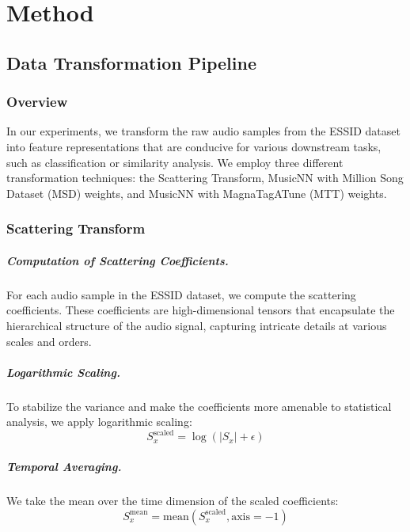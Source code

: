 \chapter{Method}
\label{ch:method}

\section{Data Transformation Pipeline}

\subsection{Overview}

In our experiments, we transform the raw audio samples from the ESSID dataset into feature representations that are conducive for various downstream tasks, such as classification or similarity analysis. We employ three different transformation techniques: the Scattering Transform, MusicNN with Million Song Dataset (MSD) weights, and MusicNN with MagnaTagATune (MTT) weights.

\subsection{Scattering Transform}

\paragraph{Computation of Scattering Coefficients.}
For each audio sample in the ESSID dataset, we compute the scattering coefficients. These coefficients are high-dimensional tensors that encapsulate the hierarchical structure of the audio signal, capturing intricate details at various scales and orders.

\paragraph{Logarithmic Scaling.}
To stabilize the variance and make the coefficients more amenable to statistical analysis, we apply logarithmic scaling:
\begin{equation}
  S_x^{\text{scaled}} = \log(|S_x| + \epsilon)
  \label{eq:log-scaling}
\end{equation}

\paragraph{Temporal Averaging.}
We take the mean over the time dimension of the scaled coefficients:
\begin{equation}
  S_x^{\text{mean}} = \text{mean}(S_x^{\text{scaled}}, \text{axis}=-1)
  \label{eq:temporal-avg}
\end{equation}

